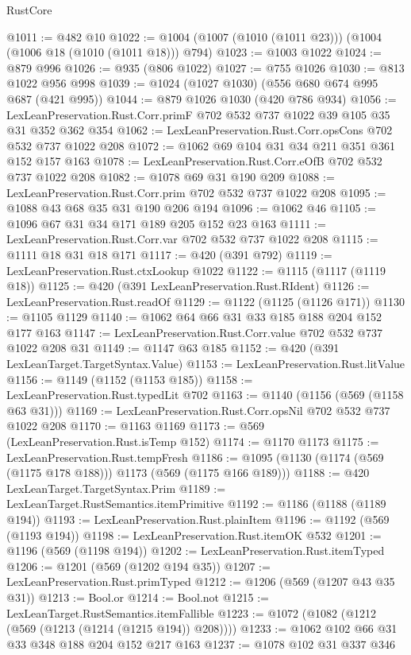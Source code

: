 \begin{lexlean}{RustCore}
\begin{coremodule}
@1011 := @482 @10
@1022 := @1004 (@1007 (@1010 (@1011 @23))) (@1004 (@1006 @18 (@1010 (@1011 @18))) @794)
@1023 := @1003 @1022
@1024 := @879 @996
@1026 := @935 (@806 @1022)
@1027 := @755 @1026
@1030 := @813 @1022 @956 @998
@1039 := @1024 (@1027 @1030) (@556 @680 @674 @995 @687 (@421 @995))
@1044 := @879 @1026 @1030 (@420 @786 @934)
@1056 := LexLeanPreservation.Rust.Corr.primF @702 @532 @737 @1022 @39 @105 @35 @31 @352 @362 @354
@1062 := LexLeanPreservation.Rust.Corr.opsCons @702 @532 @737 @1022 @208
@1072 := @1062 @69 @104 @31 @34 @211 @351 @361 @152 @157 @163
@1078 := LexLeanPreservation.Rust.Corr.eOfB @702 @532 @737 @1022 @208
@1082 := @1078 @69 @31 @190 @209
@1088 := LexLeanPreservation.Rust.Corr.prim @702 @532 @737 @1022 @208
@1095 := @1088 @43 @68 @35 @31 @190 @206 @194
@1096 := @1062 @46
@1105 := @1096 @67 @31 @34 @171 @189 @205 @152 @23 @163
@1111 := LexLeanPreservation.Rust.Corr.var @702 @532 @737 @1022 @208
@1115 := @1111 @18 @31 @18 @171
@1117 := @420 (@391 @792)
@1119 := LexLeanPreservation.Rust.ctxLookup @1022
@1122 := @1115 (@1117 (@1119 @18))
@1125 := @420 (@391 LexLeanPreservation.Rust.RIdent)
@1126 := LexLeanPreservation.Rust.readOf
@1129 := @1122 (@1125 (@1126 @171))
@1130 := @1105 @1129
@1140 := @1062 @64 @66 @31 @33 @185 @188 @204 @152 @177 @163
@1147 := LexLeanPreservation.Rust.Corr.value @702 @532 @737 @1022 @208 @31
@1149 := @1147 @63 @185
@1152 := @420 (@391 LexLeanTarget.TargetSyntax.Value)
@1153 := LexLeanPreservation.Rust.litValue
@1156 := @1149 (@1152 (@1153 @185))
@1158 := LexLeanPreservation.Rust.typedLit @702
@1163 := @1140 (@1156 (@569 (@1158 @63 @31)))
@1169 := LexLeanPreservation.Rust.Corr.opsNil @702 @532 @737 @1022 @208
@1170 := @1163 @1169
@1173 := @569 (LexLeanPreservation.Rust.isTemp @152)
@1174 := @1170 @1173
@1175 := LexLeanPreservation.Rust.tempFresh
@1186 := @1095 (@1130 (@1174 (@569 (@1175 @178 @188))) @1173 (@569 (@1175 @166 @189)))
@1188 := @420 LexLeanTarget.TargetSyntax.Prim
@1189 := LexLeanTarget.RustSemantics.itemPrimitive
@1192 := @1186 (@1188 (@1189 @194))
@1193 := LexLeanPreservation.Rust.plainItem
@1196 := @1192 (@569 (@1193 @194))
@1198 := LexLeanPreservation.Rust.itemOK @532
@1201 := @1196 (@569 (@1198 @194))
@1202 := LexLeanPreservation.Rust.itemTyped
@1206 := @1201 (@569 (@1202 @194 @35))
@1207 := LexLeanPreservation.Rust.primTyped
@1212 := @1206 (@569 (@1207 @43 @35 @31))
@1213 := Bool.or
@1214 := Bool.not
@1215 := LexLeanTarget.RustSemantics.itemFallible
@1223 := @1072 (@1082 (@1212 (@569 (@1213 (@1214 (@1215 @194)) @208))))
@1233 := @1062 @102 @66 @31 @33 @348 @188 @204 @152 @217 @163
@1237 := @1078 @102 @31 @337 @346

\end{coremodule}
\end{lexlean}
